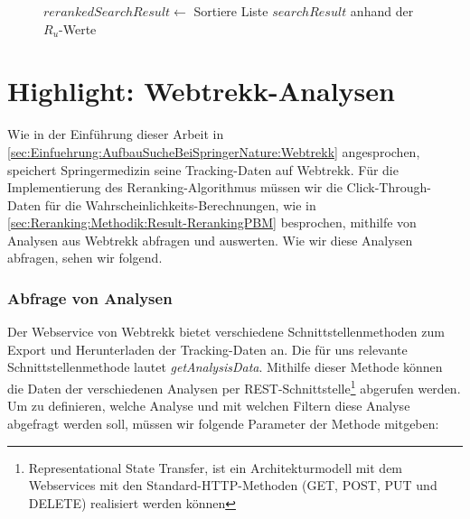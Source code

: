 \begin{figure}[H]
\begin{algorithm}[H]
{{{			\BlankLine
			$rerankedSearchResult \leftarrow$ Sortiere Liste $searchResult$ anhand der $R_{u}$-Werte\;
		}{	
		}
	}{
	}
}
\end{algorithm}
\end{figure}

\section{Highlight: Webtrekk-Analysen}
\label{sec:Implementierung:Webtrekk}

Wie in der Einführung dieser Arbeit in \ref{sec:Einfuehrung:AufbauSucheBeiSpringerNature:Webtrekk} angesprochen, speichert Springermedizin seine Tracking-Daten auf Webtrekk. Für die Implementierung des Reranking-Algorithmus müssen wir die Click-Through-Daten für die Wahrscheinlichkeits-Berechnungen, wie in \ref{sec:Reranking:Methodik:Result-RerankingPBM} besprochen, mithilfe von Analysen aus Webtrekk abfragen und auswerten. Wie wir diese Analysen abfragen, sehen wir folgend.

\subsubsection{Abfrage von Analysen}
\label{sec:Implementierung:Webtrekk:AnalysenAbfragen}

Der Webservice von Webtrekk bietet verschiedene Schnittstellenmethoden zum Export und Herunterladen der Tracking-Daten an. Die für uns relevante Schnittstellenmethode lautet \textit{getAnalysisData}. Mithilfe dieser Methode können die Daten der verschiedenen Analysen per REST-Schnittstelle\footnote{Representational State Transfer, ist ein Architekturmodell mit dem Webservices mit den Standard-HTTP-Methoden (GET, POST, PUT und DELETE) realisiert werden können} abgerufen werden. Um zu definieren, welche Analyse und mit welchen Filtern diese Analyse abgefragt werden soll, müssen wir folgende Parameter der Methode mitgeben: 

